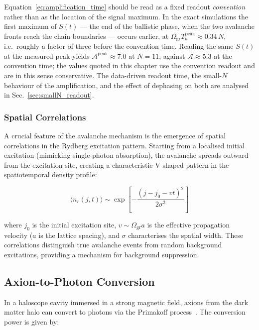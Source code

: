 Equation~\eqref{eq:amplification_time} should be read as a fixed readout \emph{convention} rather than as the location of the signal maximum. In the exact simulations the first maximum of $S(t)$ --- the end of the ballistic phase, when the two avalanche fronts reach the chain boundaries --- occurs earlier, at $\Omega_{\mathrm{gr}} T_a^{\mathrm{peak}} \approx 0.34\,N$, i.e.\ roughly a factor of three before the convention time. Reading the same $S(t)$ at the measured peak yields $\mathcal{A}^{\mathrm{peak}} \approx 7.0$ at $N=11$, against $\mathcal{A} \approx 5.3$ at the convention time; the values quoted in this chapter use the convention readout and are in this sense conservative. The data-driven readout time, the small-$N$ behaviour of the amplification, and the effect of dephasing on both are analysed in Sec.~\ref{sec:smallN_readout}.

\subsubsection{Spatial Correlations}

A crucial feature of the avalanche mechanism is the emergence of spatial correlations in the Rydberg excitation pattern. Starting from a localised initial excitation (mimicking single-photon absorption), the avalanche spreads outward from the excitation site, creating a characteristic V-shaped pattern in the spatiotemporal density profile:

\begin{equation}
    \langle n_r(j,t) \rangle \sim \exp\left[-\frac{(j - j_0 - v t)^2}{2\sigma^2}\right]
    \label{eq:spatial_profile}
\end{equation}

where $j_0$ is the initial excitation site, $v \sim \Omega_{\mathrm{gr}} a$ is the effective propagation velocity ($a$ is the lattice spacing), and $\sigma$ characterises the spatial width. These correlations distinguish true avalanche events from random background excitations, providing a mechanism for background suppression.

\subsection*{Axion-to-Photon Conversion}

In a haloscope cavity immersed in a strong magnetic field, axions from the dark matter halo can convert to photons via the Primakoff process~\cite{Sikivie1983}. The conversion power is given by:

